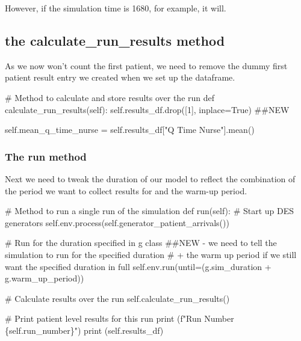 \documentclass[
  letterpaper,
  DIV=11,
  numbers=noendperiod]{scrreprt}
\newenvironment{Shaded}{}{}
\newcommand{\BuiltInTok}[1]{\textcolor[rgb]{0.84,0.23,0.29}{#1}}
\newcommand{\CommentTok}[1]{\textcolor[rgb]{0.42,0.45,0.49}{#1}}
\newcommand{\DecValTok}[1]{\textcolor[rgb]{0.00,0.36,0.77}{#1}}
\newcommand{\KeywordTok}[1]{\textcolor[rgb]{0.84,0.23,0.29}{#1}}
\newcommand{\NormalTok}[1]{\textcolor[rgb]{0.14,0.16,0.18}{#1}}
\newcommand{\OperatorTok}[1]{\textcolor[rgb]{0.14,0.16,0.18}{#1}}
\newcommand{\SpecialCharTok}[1]{\textcolor[rgb]{0.00,0.36,0.77}{#1}}
\newcommand{\SpecialStringTok}[1]{\textcolor[rgb]{0.01,0.18,0.38}{#1}}
\newcommand{\StringTok}[1]{\textcolor[rgb]{0.01,0.18,0.38}{#1}}
\newcommand{\VariableTok}[1]{\textcolor[rgb]{0.89,0.38,0.04}{#1}}
\begin{document}
However, if the simulation time is 1680, for example, it will.

\subsection{the calculate\_run\_results
method}\label{the-calculate_run_results-method-1}

As we now won't count the first patient, we need to remove the dummy
first patient result entry we created when we set up the dataframe.

\label{dummy_remove}
\begin{Shaded}
\begin{Highlighting}[]
\CommentTok{\# Method to calculate and store results over the run}
\KeywordTok{def}\NormalTok{ calculate\_run\_results(}\VariableTok{self}\NormalTok{):}
    \VariableTok{self}\NormalTok{.results\_df.drop([}\DecValTok{1}\NormalTok{], inplace}\OperatorTok{=}\VariableTok{True}\NormalTok{) }\CommentTok{\#\#NEW}

    \VariableTok{self}\NormalTok{.mean\_q\_time\_nurse }\OperatorTok{=} \VariableTok{self}\NormalTok{.results\_df[}\StringTok{"Q Time Nurse"}\NormalTok{].mean()}
\end{Highlighting}
\end{Shaded}

\subsubsection{The run method}\label{the-run-method-1}

Next we need to tweak the duration of our model to reflect the
combination of the period we want to collect results for and the warm-up
period.

\label{single_run}
\begin{Shaded}
\begin{Highlighting}[]
\CommentTok{\# Method to run a single run of the simulation}
\KeywordTok{def}\NormalTok{ run(}\VariableTok{self}\NormalTok{):}
    \CommentTok{\# Start up DES generators}
    \VariableTok{self}\NormalTok{.env.process(}\VariableTok{self}\NormalTok{.generator\_patient\_arrivals())}

    \CommentTok{\# Run for the duration specified in g class}
    \CommentTok{\#\#NEW {-} we need to tell the simulation to run for the specified duration}
    \CommentTok{\# + the warm up period if we still want the specified duration in full}
    \VariableTok{self}\NormalTok{.env.run(until}\OperatorTok{=}\NormalTok{(g.sim\_duration }\OperatorTok{+}\NormalTok{ g.warm\_up\_period))}

    \CommentTok{\# Calculate results over the run}
    \VariableTok{self}\NormalTok{.calculate\_run\_results()}

    \CommentTok{\# Print patient level results for this run}
    \BuiltInTok{print}\NormalTok{ (}\SpecialStringTok{f"Run Number }\SpecialCharTok{\{}\VariableTok{self}\SpecialCharTok{.}\NormalTok{run\_number}\SpecialCharTok{\}}\SpecialStringTok{"}\NormalTok{)}
    \BuiltInTok{print}\NormalTok{ (}\VariableTok{self}\NormalTok{.results\_df)}
\end{Highlighting}
\end{Shaded}
\end{document}
